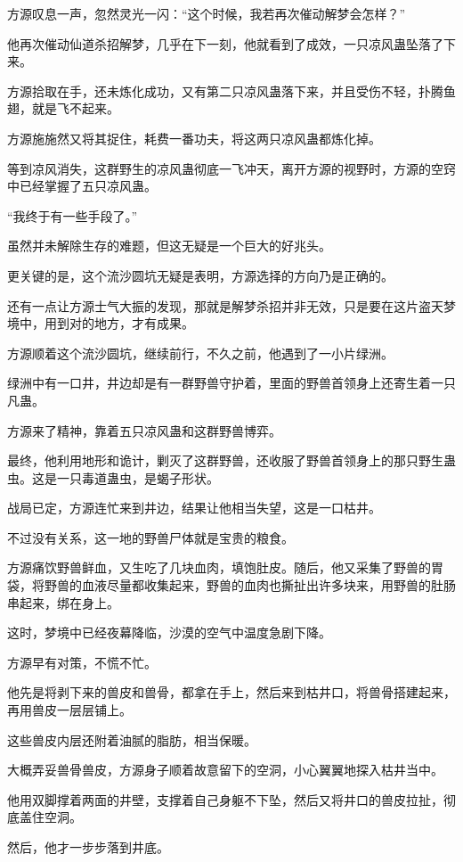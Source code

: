 \begin{this_body}
方源叹息一声，忽然灵光一闪：“这个时候，我若再次催动解梦会怎样？”

他再次催动仙道杀招解梦，几乎在下一刻，他就看到了成效，一只凉风蛊坠落了下来。

方源拾取在手，还未炼化成功，又有第二只凉风蛊落下来，并且受伤不轻，扑腾鱼翅，就是飞不起来。

方源施施然又将其捉住，耗费一番功夫，将这两只凉风蛊都炼化掉。

等到凉风消失，这群野生的凉风蛊彻底一飞冲天，离开方源的视野时，方源的空窍中已经掌握了五只凉风蛊。

“我终于有一些手段了。”

虽然并未解除生存的难题，但这无疑是一个巨大的好兆头。

更关键的是，这个流沙圆坑无疑是表明，方源选择的方向乃是正确的。

还有一点让方源士气大振的发现，那就是解梦杀招并非无效，只是要在这片盗天梦境中，用到对的地方，才有成果。

方源顺着这个流沙圆坑，继续前行，不久之前，他遇到了一小片绿洲。

绿洲中有一口井，井边却是有一群野兽守护着，里面的野兽首领身上还寄生着一只凡蛊。

方源来了精神，靠着五只凉风蛊和这群野兽博弈。

最终，他利用地形和诡计，剿灭了这群野兽，还收服了野兽首领身上的那只野生蛊虫。这是一只毒道蛊虫，是蝎子形状。

战局已定，方源连忙来到井边，结果让他相当失望，这是一口枯井。

不过没有关系，这一地的野兽尸体就是宝贵的粮食。

方源痛饮野兽鲜血，又生吃了几块血肉，填饱肚皮。随后，他又采集了野兽的胃袋，将野兽的血液尽量都收集起来，野兽的血肉也撕扯出许多块来，用野兽的肚肠串起来，绑在身上。

这时，梦境中已经夜幕降临，沙漠的空气中温度急剧下降。

方源早有对策，不慌不忙。

他先是将剥下来的兽皮和兽骨，都拿在手上，然后来到枯井口，将兽骨搭建起来，再用兽皮一层层铺上。

这些兽皮内层还附着油腻的脂肪，相当保暖。

大概弄妥兽骨兽皮，方源身子顺着故意留下的空洞，小心翼翼地探入枯井当中。

他用双脚撑着两面的井壁，支撑着自己身躯不下坠，然后又将井口的兽皮拉扯，彻底盖住空洞。

然后，他才一步步落到井底。


\end{this_body}
